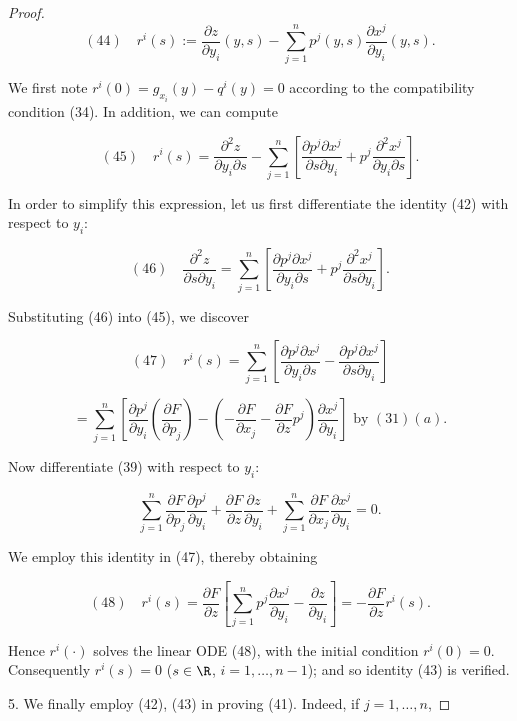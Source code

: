 \begin{proof}
$$(44) \quad r^i(s) := \frac{\partial z}{\partial y_i}(y, s) - \sum_{j=1}^{n} p^j(y, s) \frac{\partial x^j}{\partial y_i}(y, s).$$

We first note $r^i(0) = g_{x_i}(y) - q^i(y) = 0$ according to the compatibility condition (34). In addition, we can compute

$$(45) \quad r^i(s) = \frac{\partial^2 z}{\partial y_i \partial s} - \sum_{j=1}^{n} \left[ \frac{\partial p^j \partial x^j}{\partial s \partial y_i} + p^j \frac{\partial^2 x^j}{\partial y_i \partial s} \right].$$

In order to simplify this expression, let us first differentiate the identity (42) with respect to $y_i$:

$$(46) \quad \frac{\partial^2 z}{\partial s \partial y_i} = \sum_{j=1}^{n} \left[ \frac{\partial p^j \partial x^j}{\partial y_i \partial s} + p^j \frac{\partial^2 x^j}{\partial s \partial y_i} \right].$$

Substituting (46) into (45), we discover

$$(47) \quad r^i(s) = \sum_{j=1}^{n} \left[ \frac{\partial p^j \partial x^j}{\partial y_i \partial s} - \frac{\partial p^j \partial x^j}{\partial s \partial y_i} \right]$$

$$= \sum_{j=1}^{n} \left[ \frac{\partial p^j}{\partial y_i} \left( \frac{\partial F}{\partial p_j} \right) - \left( -\frac{\partial F}{\partial x_j} - \frac{\partial F}{\partial z} p^j \right) \frac{\partial x^j}{\partial y_i} \right] \text{ by } (31)(a).$$

Now differentiate (39) with respect to $y_i$:

$$\sum_{j=1}^{n} \frac{\partial F}{\partial p_j} \frac{\partial p^j}{\partial y_i} + \frac{\partial F}{\partial z} \frac{\partial z}{\partial y_i} + \sum_{j=1}^{n} \frac{\partial F}{\partial x_j} \frac{\partial x^j}{\partial y_i} = 0.$$

We employ this identity in (47), thereby obtaining

$$(48) \quad r^i(s) = \frac{\partial F}{\partial z} \left[ \sum_{j=1}^{n} p^j \frac{\partial x^j}{\partial y_i} - \frac{\partial z}{\partial y_i} \right] = -\frac{\partial F}{\partial z} r^i(s).$$

Hence $r^i(\cdot)$ solves the linear ODE (48), with the initial condition $r^i(0) = 0$. Consequently $r^i(s) = 0$ ($s \in \R$, $i = 1, \ldots, n-1$); and so identity (43) is verified.

5. We finally employ (42), (43) in proving (41). Indeed, if $j = 1, \ldots, n$,


\end{proof}
